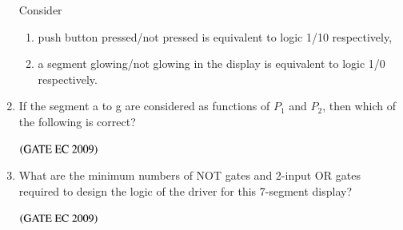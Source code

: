 \documentclass[journal,12pt,onecolumn]{IEEEtran}
\theoremstyle{remark}
\begin{document}
\begin{enumerate}[start=1, label={Q\arabic*.}]
Consider
\begin{enumerate}
\item push button pressed/not pressed is equivalent to logic 1/10 respectively,

\item a segment glowing/not glowing in the display is equivalent to logic 1/0 respectively.
\end{enumerate}
\item If the segment a to g are considered as functions of $P_1$ and $P_2$, then which of the following is correct?
\begin{enumerate}
\end{enumerate}
\hfill $\left(\text{GATE EC 2009}\right)$

\item What are the minimum numbers of NOT gates and 2-input OR gates required to design the logic of the driver for this 7-segment display?

\begin{enumerate}
\end{enumerate}
\hfill $\left(\text{GATE EC 2009}\right)$
\end{enumerate}
\end{document}
